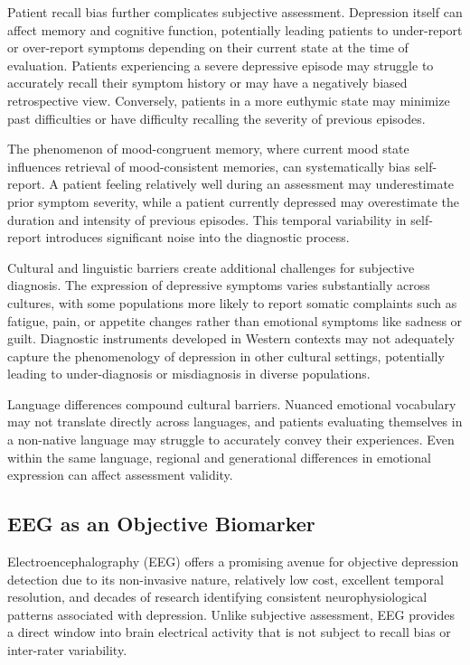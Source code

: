\documentclass[blue,fullpaper]{ludusofficial}  %
\begin{document}
Patient recall bias further complicates subjective assessment. Depression itself can affect memory and cognitive function, potentially leading patients to under-report or over-report symptoms depending on their current state at the time of evaluation. Patients experiencing a severe depressive episode may struggle to accurately recall their symptom history or may have a negatively biased retrospective view. Conversely, patients in a more euthymic state may minimize past difficulties or have difficulty recalling the severity of previous episodes.

The phenomenon of mood-congruent memory, where current mood state influences retrieval of mood-consistent memories, can systematically bias self-report. A patient feeling relatively well during an assessment may underestimate prior symptom severity, while a patient currently depressed may overestimate the duration and intensity of previous episodes. This temporal variability in self-report introduces significant noise into the diagnostic process.

Cultural and linguistic barriers create additional challenges for subjective diagnosis. The expression of depressive symptoms varies substantially across cultures, with some populations more likely to report somatic complaints such as fatigue, pain, or appetite changes rather than emotional symptoms like sadness or guilt. Diagnostic instruments developed in Western contexts may not adequately capture the phenomenology of depression in other cultural settings, potentially leading to under-diagnosis or misdiagnosis in diverse populations.

Language differences compound cultural barriers. Nuanced emotional vocabulary may not translate directly across languages, and patients evaluating themselves in a non-native language may struggle to accurately convey their experiences. Even within the same language, regional and generational differences in emotional expression can affect assessment validity.

\subsection{EEG as an Objective Biomarker}

Electroencephalography (EEG) offers a promising avenue for objective depression detection due to its non-invasive nature, relatively low cost, excellent temporal resolution, and decades of research identifying consistent neurophysiological patterns associated with depression. Unlike subjective assessment, EEG provides a direct window into brain electrical activity that is not subject to recall bias or inter-rater variability.
\end{document}
